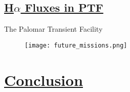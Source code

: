 \documentclass[12pt]{article} %
\numberwithin{equation}{section} %
\begin{document}
\subsection[H$\alpha$ Fluxes in PTF]{\hyperlink{toc}{H$\alpha$ Fluxes in PTF}}

The Palomar Transient Facility

\begin{figure}[H]
\centering
\texttt{[image: future\_missions.png]}
\caption{}
\label{fig: future_missions}
\end{figure}





\section[Conclusion]{\hyperlink{toc}{Conclusion}}


\appendix


\newpage

\printindex



\end{document}
